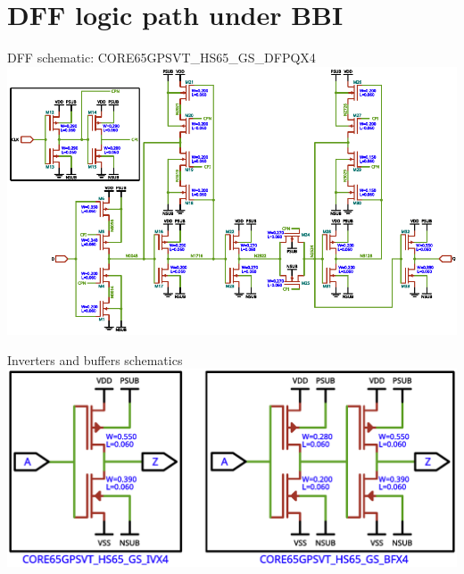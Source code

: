 
\section{DFF logic path under BBI}
\begin{frame}{DFF schematic: CORE65GPSVT\_HS65\_GS\_DFPQX4}
	\centering
	\vspace{2mm}
	\includegraphics[width=\textwidth]{./figures/CORE65GPSVT_HS65_GS_DFPQX4.pdf}
\end{frame}

\begin{frame}{Inverters and buffers schematics}
	\centering
	\vspace{5mm}
	\includegraphics[width=\textwidth]{./figures/IVX_BUFF_X4.pdf}
\end{frame}

